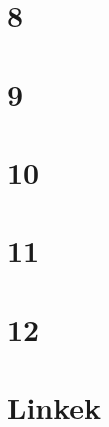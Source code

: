 \begin{spacing}{1.4}
\section*{8} \label{DBprojektharmadikharmadik8}
\Desc{

}
\vspace{0.5cm}
\newpage
\section*{9} \label{DBprojektharmadikharmadik9}
\Desc{

}
\vspace{0.5cm}
\newpage
\section*{10} \label{DBprojektharmadikharmadik10}
\Desc{

}
\vspace{0.5cm}
\newpage
\section*{11} \label{DBprojektharmadikharmadik11}
\Desc{

}
\vspace{0.5cm}
\newpage
\section*{12} \label{DBprojektharmadikharmadik12}
\Desc{

}
\vspace{0.5cm}
\newpage
\section*{Linkek} \label{DBlink}
\Desc{

}
\vspace{0.5cm}
\newpage

\end{spacing}


